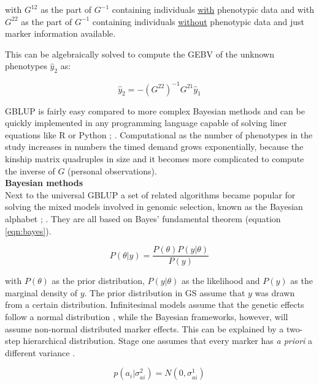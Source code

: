 with $G^{12}$ as the part of $G^{-1}$ containing individuals \underline{with} phenotypic data and with
$G^{22}$ as the part of $G^{-1}$ containing individuals \underline{without} phenotypic data and just
marker information available.

This can be algebraically solved to compute the GEBV of the unknown phenotypes $\hat{y}_2$  as:

\begin{equation}
\hat{y}_2 = -\left( G^{22}\right)^{-1}G^{21}\hat{y}_1
\label{eqn:gpred}
\end{equation}

GBLUP is fairly easy compared to more complex Bayesian methods and can be quickly implemented in any
programming language capable of solving liner equations like R or Python \cite{CRAN};
\cite{van1995python}. Computational as the number of phenotypes in the study increases in numbers
the timed demand grows exponentially, because the kinship matrix quadruples in size and
it becomes more complicated to compute the inverse of $G$ (personal observations). \\

\noindent
\textbf{Bayesian methods} \\ 

Next to the universal GBLUP a set of related algorithms became popular for solving the mixed models
involved in genomic selection, known as the Bayesian alphabet \cite{gianola2009};
\cite{gianola2013}. They are all based on Bayes' fundamental theorem (equation \ref{eqn:bayes}).

\begin{equation}
P(\theta | y) = \frac{P(\theta )P(y | \theta)}{P(y)} 
\label{eqn:bayes}
\end{equation}

with $P(\theta )$ as the prior distribution, $P(y|\theta )$ as the likelihood and $P(y)$
as the marginal density of $y$. The prior distribution in GS assume that $y$ was drawn
from a certain distribution. Infinitesimal models assume that the genetic effects follow a
normal distribution \cite{legarra2018}, while the Bayesian frameworks, however, will
assume non-normal distributed marker effects. This can be explained by a two-step
hierarchical distribution. Stage one assumes that every marker has \textit{a priori} a
different variance \cite{legarra2018}.

\begin{equation}
p(a_i|\sigma_{ai}^2) = N (0,\sigma^1_{ai})
 \label{eqn:stageonbayes}
\end{equation}

